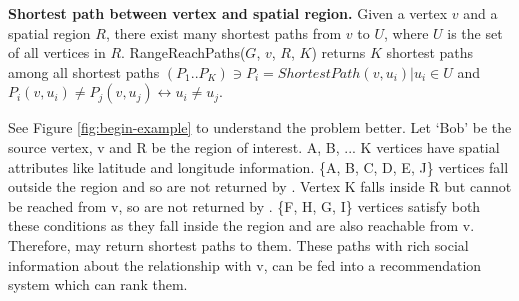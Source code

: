 \textbf{Shortest path between vertex and spatial region.} Given a vertex $v$ and a spatial region $R$, there exist many shortest paths from $v$ to $U$, where $U$ is the set of all vertices in $R$. RangeReachPaths($G$, $v$, $R$, $K$) returns $K$ shortest paths among all shortest paths $(P_1..P_K) \ni P_i = ShortestPath(v, u_i) | u_i \in U$ and $P_i(v, u_i) \neq P_j(v, u_j) \leftrightarrow u_i \neq u_j$.

\iffalse
Given a graph $G(V, E)$ where,

\quad$V \rightarrow set\ of\ vertices$

\quad$E \rightarrow set\ of\ edges$

$Vs \subset V$ have spatial attributes; i.e. $\forall v \in Vs \Leftrightarrow v.spatial$ attribute exists\\


\textbf{RangeReachPaths S(G, v, R, K):} an ordered list of K shortest paths starting from v that reach a region R in graph G, where R is a spatial range predicate. Let's abbreviate this as {\rrp}(G, v, R, K).

\textbf{Path, P(u, w):} A set of vertices along the way from u to w \(\Rightarrow w\ is\ reachable\ from\ u\)

\quad${P(u, w) \in S(v, R) \Leftrightarrow}$

\quad\quad{u = v and}

\quad\quad${w \in Vs}$ and

\quad\quad{w.spatial lies in region R}\\

\fi

See Figure \ref{fig:begin-example} to understand the problem better. Let `Bob' be the source vertex, v and R be the region of interest. A, B, ... K vertices have spatial attributes like latitude and longitude information. \{A, B, C, D, E, J\} vertices fall outside the region and so are not returned by {\rrp}. Vertex K falls inside R but cannot be reached from v, so are not returned by {\rrp}. \{F, H, G, I\} vertices satisfy both these conditions as they fall inside the region and are also reachable from v. Therefore, {\rrp} may return shortest paths to them. These paths with rich social information about the relationship with v, can be fed into a recommendation system which can rank them.
